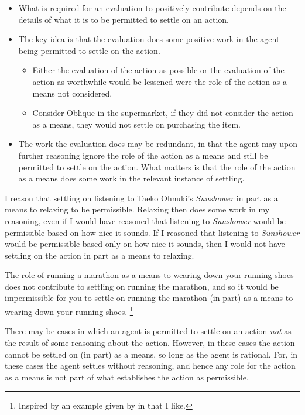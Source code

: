 \documentclass[10pt]{article}
\begin{document}
\begin{itemize}[noitemsep]
\item What is required for an evaluation to positively contribute depends on the details of what it is to be permitted to settle on an action.
\item The key idea is that the evaluation does some positive work in the agent being permitted to settle on the action.
  \begin{itemize}
  \item Either the evaluation of the action as possible or the evaluation of the action as worthwhile would be lessened were the role of the action as a means not considered.
  \item Consider Oblique in the supermarket, if they did not consider the action as a means, they would not settle on purchasing the item.
  \end{itemize}
\item The work the evaluation does may be redundant, in that the agent may upon further reasoning ignore the role of the action as a means and still be permitted to settle on the action.
  What matters is that the role of the action as a means does some work in the relevant instance of settling.
\end{itemize}


\begin{example}
  I reason that settling on listening to Taeko Ohnuki's \emph{Sunshower} in part as a means to relaxing to be permissible.
  Relaxing then does some work in my reasoning, even if I would have reasoned that listening to \emph{Sunshower} would be permissible based on how nice it sounds.
  If I reasoned that listening to \emph{Sunshower} would be permissible based only on how nice it sounds, then I would not have settling on the action in part as a means to relaxing.
\end{example}

\begin{example}
  The role of running a marathon as a means to wearing down your running shoes does not contribute to settling on running the marathon, and so it would be impermissible for you to settle on running the marathon (in part) as a means to wearing down your running shoes.\nolinebreak
  \footnote{Inspired by an example given by \citeauthor{Bratman:1987aa} in  that I like.}
\end{example}

There may be cases in which an agent is permitted to settle on an action \emph{not} as the result of some reasoning about the action.
However, in these cases the action cannot be settled on (in part) as a means, so long as the agent is rational.
For, in these cases the agent settles without reasoning, and hence any role for the action as a means is not part of what establishes the action as permissible.
\end{document}
